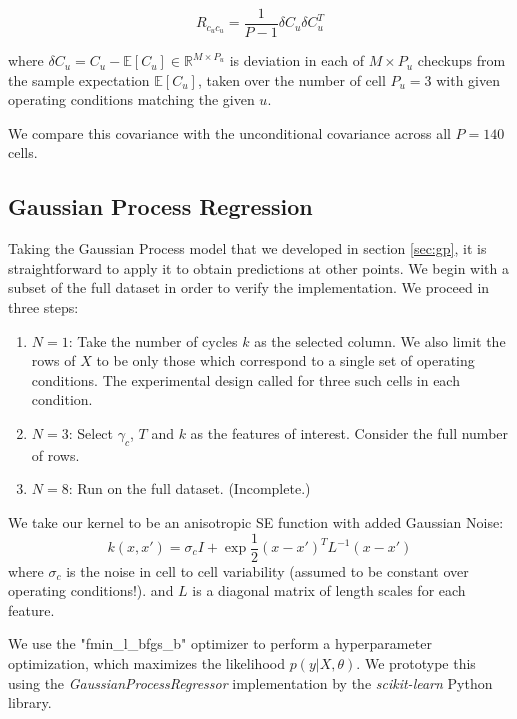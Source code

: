 \documentclass[conference]{IEEEtran}
\newcommand{\R}{\mathbb{R}}
\newcommand{\E}{\mathbb{E}}
\begin{document}
\begin{equation*}
    R_{c_u c_u} = \frac{1}{P-1} \delta C_u \delta C_u^T
\end{equation*}

where $\delta C_u = C_u - \E[C_u]\in \R^{M \times P_u}$ is
deviation in each of 
$M\times P_u$ checkups from the sample expectation $\E[C_u]$, taken over the number
of cell $P_u=3$ with given operating conditions matching the given $u$.

We compare this covariance with the unconditional covariance across
all $P=140$ cells.


\subsection{Gaussian Process Regression}
Taking the Gaussian Process model that we developed in section \ref{sec:gp},
it is straightforward to apply it to obtain predictions at other
points. We begin with a subset of the full dataset in order to
verify the implementation. We proceed in three steps:
\begin{enumerate}
    \item $N=1$: Take the number of cycles $k$ as the selected column.
        We also limit the rows of $X$ to be only those which correspond
        to a single set of operating conditions. The experimental
        design called for three such cells in each condition.

    \item $N=3$: Select $\gamma_{c}$, $T$ and $k$ as the features
        of interest. Consider the full number of rows.
    \item $N=8$: Run on the full dataset. (Incomplete.)
\end{enumerate}

We take our kernel to be an anisotropic SE function with added
Gaussian Noise:
\begin{equation*}
    k(x, x') = \sigma_c I + \exp{\frac{1}{2} (x - x')^T L^{-1} (x - x')}
\end{equation*}
where $\sigma_c$ is the noise in cell to cell variability (assumed
to be constant over operating conditions!).
and $L$ is a diagonal matrix of length scales for each
feature.

We use the "fmin\_l\_bfgs\_b" optimizer to perform a hyperparameter
optimization, which maximizes the likelihood $p(y|X,\theta)$.
We prototype this using the {\it GaussianProcessRegressor} implementation
by the {\it scikit-learn}\cite{noauthor_17_nodate} Python library.
\end{document}
